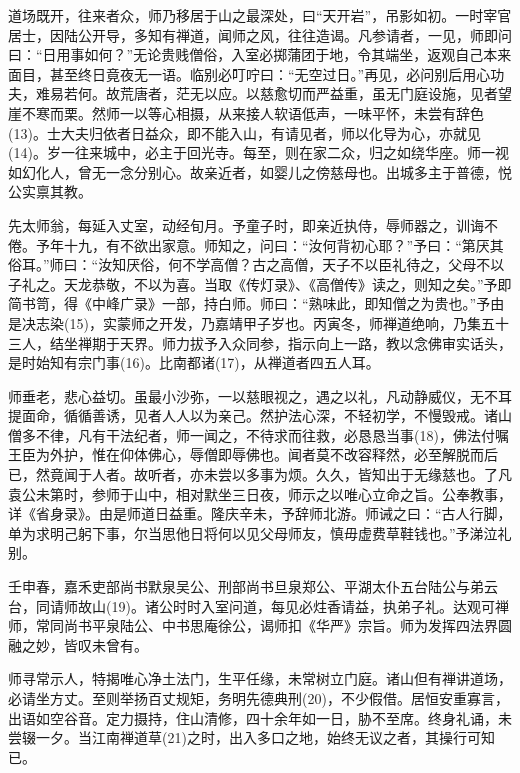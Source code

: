 \documentclass[12pt,twoside,openany]{book}
\begin{document}
道场既开，往来者众，师乃移居于山之最深处，曰“天开岩”，吊影如初。一时宰官居士，因陆公开导，多知有禅道，闻师之风，往往造谒。凡参请者，一见，师即问曰：“日用事如何？”无论贵贱僧俗，入室必掷蒲团于地，令其端坐，返观自己本来面目，甚至终日竟夜无一语。临别必叮咛曰：“无空过日。”再见，必问别后用心功夫，难易若何。故荒唐者，茫无以应。以慈愈切而严益重，虽无门庭设施，见者望崖不寒而栗。然师一以等心相摄，从来接人软语低声，一味平怀，未尝有辞色(13)。士大夫归依者日益众，即不能入山，有请见者，师以化导为心，亦就见(14)。岁一往来城中，必主于回光寺。每至，则在家二众，归之如绕华座。师一视如幻化人，曾无一念分别心。故亲近者，如婴儿之傍慈母也。出城多主于普德，悦公实禀其教。

先太师翁，每延入丈室，动经旬月。予童子时，即亲近执侍，辱师器之，训诲不倦。予年十九，有不欲出家意。师知之，问曰：“汝何背初心耶？”予曰：“第厌其俗耳。”师曰：“汝知厌俗，何不学高僧？古之高僧，天子不以臣礼待之，父母不以子礼之。天龙恭敬，不以为喜。当取《传灯录》、《高僧传》读之，则知之矣。”予即简书笥，得《中峰广录》一部，持白师。师曰：“熟味此，即知僧之为贵也。”予由是决志染(15)，实蒙师之开发，乃嘉靖甲子岁也。丙寅冬，师禅道绝响，乃集五十三人，结坐禅期于天界。师力拔予入众同参，指示向上一路，教以念佛审实话头，是时始知有宗门事(16)。比南都诸(17)，从禅道者四五人耳。

师垂老，悲心益切。虽最小沙弥，一以慈眼视之，遇之以礼，凡动静威仪，无不耳提面命，循循善诱，见者人人以为亲己。然护法心深，不轻初学，不慢毁戒。诸山僧多不律，凡有干法纪者，师一闻之，不待求而往救，必恳恳当事(18)，佛法付嘱王臣为外护，惟在仰体佛心，辱僧即辱佛也。闻者莫不改容释然，必至解脱而后已，然竟闻于人者。故听者，亦未尝以多事为烦。久久，皆知出于无缘慈也。了凡袁公未第时，参师于山中，相对默坐三日夜，师示之以唯心立命之旨。公奉教事，详《省身录》。由是师道日益重。隆庆辛未，予辞师北游。师诫之曰：“古人行脚，单为求明己躬下事，尔当思他日将何以见父母师友，慎毋虚费草鞋钱也。”予涕泣礼别。

壬申春，嘉禾吏部尚书默泉吴公、刑部尚书旦泉郑公、平湖太仆五台陆公与弟云台，同请师故山(19)。诸公时时入室问道，每见必炷香请益，执弟子礼。达观可禅师，常同尚书平泉陆公、中书思庵徐公，谒师扣《华严》宗旨。师为发挥四法界圆融之妙，皆叹未曾有。

师寻常示人，特揭唯心净土法门，生平任缘，未常树立门庭。诸山但有禅讲道场，必请坐方丈。至则举扬百丈规矩，务明先德典刑(20)，不少假借。居恒安重寡言，出语如空谷音。定力摄持，住山清修，四十余年如一日，胁不至席。终身礼诵，未尝辍一夕。当江南禅道草(21)之时，出入多口之地，始终无议之者，其操行可知已。
\end{document}
